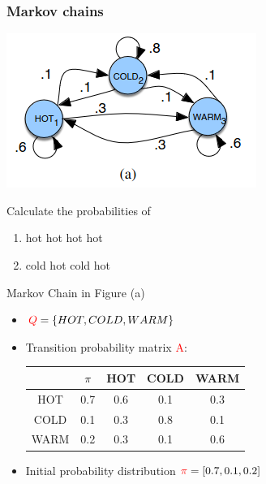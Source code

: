 \documentclass[13.5pt,aspecratio=169]{beamer}
\begin{document}
\begin{frame}
    \onehalfspacing
        \frametitle{Markov chains}
        
        \begin{minipage}{0.5\textwidth}
            \includegraphics[scale=0.7]{Example_1.png}

            {
            \begin{minipage}{0.85\textwidth}
            \begin{block}{Calculate the probabilities of}
                \begin{enumerate}
                    \item hot hot hot hot
                    \item cold hot cold hot
                \end{enumerate}
            \end{block}
            \end{minipage}

            }
        \end{minipage}
        \begin{minipage}{0.49\textwidth}
            \begin{block}{}
                Markov Chain in Figure (a)
            \end{block}

            \begin{itemize}
                \item $\textcolor{red}{Q} = \{HOT, COLD, WARM \} $ 
                \item Transition probability matrix \textcolor{red}{A}: 
                \hspace*{-1cm}
                {
                \small
                \begin{tabular}{c|cccc}
                    $ $ & $\pi$ & HOT & COLD & WARM \\
                    \hline
                    HOT & 0.7 & 0.6 & 0.1 & 0.3 \\
                    COLD & 0.1 & 0.3 & 0.8 & 0.1\\
                    WARM & 0.2 & 0.3 & 0.1 & 0.6 \\
                \end{tabular}
                }
                \item Initial probability distribution $\textcolor{red}{\pi} = [0.7,0.1,0.2]$
                

\end{itemize}
\end{minipage}
\end{frame}
\end{document}
